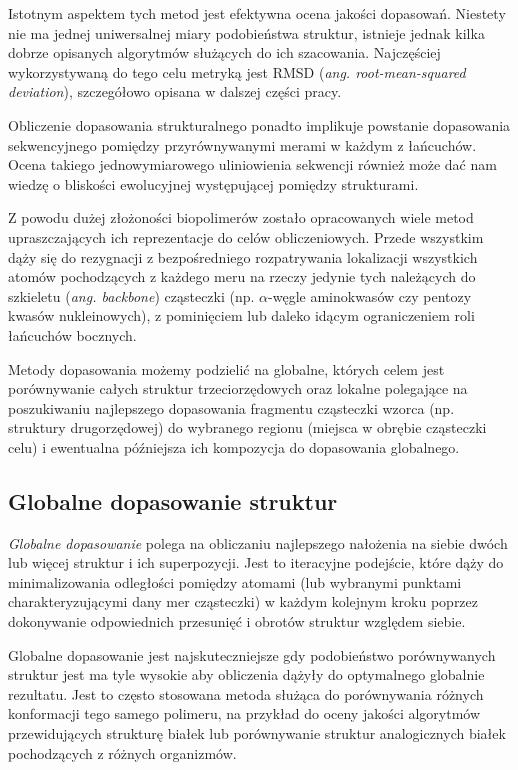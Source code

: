 \documentclass[licencjacka]{pracamgr}
\begin{document}
Istotnym aspektem tych metod jest efektywna ocena jakości dopasowań. Niestety nie ma jednej uniwersalnej miary podobieństwa struktur,  istnieje jednak kilka dobrze opisanych algorytmów służących do ich szacowania. Najczęściej wykorzystywaną do tego celu metryką jest RMSD (\textit{ang. root-mean-squared deviation}), szczegółowo opisana w dalszej części pracy.

Obliczenie dopasowania strukturalnego ponadto implikuje powstanie dopasowania sekwencyjnego pomiędzy przyrównywanymi merami w każdym z łańcuchów. Ocena takiego jednowymiarowego uliniowienia sekwencji również może dać nam wiedzę o bliskości ewolucyjnej występującej pomiędzy strukturami.

Z powodu dużej złożoności biopolimerów zostało opracowanych wiele metod upraszczających ich reprezentacje do celów obliczeniowych. Przede wszystkim dąży się do rezygnacji z bezpośredniego rozpatrywania lokalizacji wszystkich atomów pochodzących z każdego meru na rzeczy jedynie tych należących do szkieletu (\textit{ang. backbone}) cząsteczki (np. $\alpha$-węgle aminokwasów czy pentozy kwasów nukleinowych), z pominięciem lub daleko idącym ograniczeniem roli łańcuchów bocznych.

Metody dopasowania możemy podzielić na globalne, których celem jest porównywanie całych struktur trzeciorzędowych oraz lokalne polegające na poszukiwaniu najlepszego dopasowania fragmentu cząsteczki wzorca (np. struktury drugorzędowej) do wybranego regionu (miejsca w obrębie cząsteczki celu) i ewentualna późniejsza ich kompozycja do dopasowania globalnego.

\subsection{Globalne dopasowanie struktur} 

\textit{Globalne dopasowanie} polega na obliczaniu najlepszego nałożenia na siebie dwóch lub więcej struktur i ich superpozycji. Jest to iteracyjne podejście, które dąży do minimalizowania odległości pomiędzy atomami (lub wybranymi punktami charakteryzującymi dany mer cząsteczki) w każdym kolejnym kroku poprzez dokonywanie odpowiednich przesunięć i obrotów struktur względem siebie. 

Globalne dopasowanie jest najskuteczniejsze gdy podobieństwo porównywanych struktur jest ma tyle wysokie aby obliczenia dążyły do optymalnego globalnie rezultatu. Jest to często stosowana metoda służąca do porównywania różnych konformacji tego samego polimeru, na przykład do oceny jakości algorytmów przewidujących strukturę białek lub porównywanie struktur analogicznych białek pochodzących z różnych organizmów. 
\end{document}
